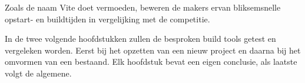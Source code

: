 Zoals de naam Vite doet vermoeden, beweren de makers ervan bliksemsnelle opstart- en buildtijden in vergelijking met de competitie.


In de twee volgende hoofdstukken zullen de besproken build tools getest en vergeleken worden. Eerst bij het opzetten van een nieuw project en daarna bij het omvormen van een bestaand. Elk hoofdstuk bevat een eigen conclusie, als laatste volgt de algemene.

